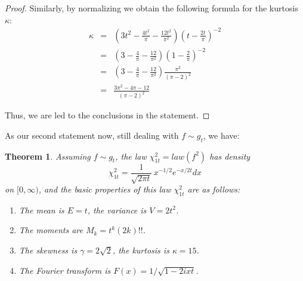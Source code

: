 \documentclass[12pt]{amsbook}
\newtheorem{theorem}{Theorem}[chapter]
\begin{document}
\begin{proof}
Similarly, by normalizing we obtain the following formula for the kurtosis $\kappa$:
\begin{eqnarray*}
\kappa
&=&\left(3t^2-\frac{4t^2}{\pi}-\frac{12t^2}{\pi^2}\right)\left(t-\frac{2t}{\pi}\right)^{-2}\\
&=&\left(3-\frac{4}{\pi}-\frac{12}{\pi^2}\right)\left(1-\frac{2}{\pi}\right)^{-2}\\
&=&\left(3-\frac{4}{\pi}-\frac{12}{\pi^2}\right)\frac{\pi^2}{(\pi-2)^2}\\
&=&\frac{3\pi^2-4\pi-12}{(\pi-2)^2}
\end{eqnarray*}

Thus, we are led to the conclusions in the statement.
\end{proof}

As our second statement now, still dealing with $f\sim g_t$, we have:

\begin{theorem}
Assuming $f\sim g_t$, the law $\chi_{1t}^2=law(f^2)$ has density
$$\chi^2_{1t}=\frac{1}{\sqrt{2\pi t}}\,x^{-1/2}e^{-x/2t}dx$$
on $[0,\infty)$, and the basic properties of this law $\chi_{1t}^2$ are as follows:
\begin{enumerate}
\item The mean is $E=t$, the variance is $V=2t^2$.

\item The moments are $M_k=t^k(2k)!!$.

\item The skewness is $\gamma=2\sqrt{2}$, the kurtosis is $\kappa=15$.

\item The Fourier transform is $F(x)=1/\sqrt{1-2ixt}$.
\end{enumerate}
\end{theorem}
\end{document}
